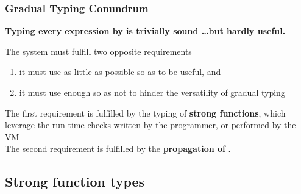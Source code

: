 \begin{frame}
\frametitle{Gradual Typing Conundrum}
\textbf{\color{darkslateblue}Typing every expression by  is trivially sound \ldots but hardly useful.}

\bigskip
\pause
The system must fulfill two opposite requirements
\begin{enumerate}
	\item it must use   as little as possible so as to be useful, and
	\item it must use  enough so as not to hinder the versatility of
	      gradual typing
\end{enumerate}


\bigskip
\pause
The first requirement is fulfilled by the typing of \textbf{\color{darkslateblue}strong functions}, which leverage the run-time checks written by the programmer, or performed by the VM\\[3mm]
The second requirement is fulfilled by the \textbf{\color{darkslateblue}propagation of }.
\end{frame}

\subsection{Strong function types}


